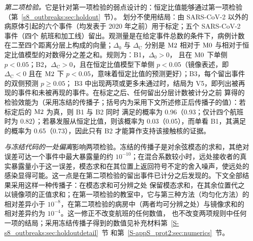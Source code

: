 \emph{第二项检验。}它是针对第一项检验的弱点设计的：恒定比值能够通过第一项检验（第~\ref{s8_outbreaks:sec:holdout}~节）。
划分不使用结局：由 SARS-CoV-2 以外的病原体引起的六个事件（均发表于 2020 年之前）用于标定；五个 SARS-CoV-2 事件（四个
航班和加工线）留出。观测量是在给定事件总数的条件下，病例计数在二至四个距离分层上构成的向量；$\Delta_0$ 与
$\Delta_{\mathrm{C}}$ 分别是 $\mathrm{M2}$ 相对于 $\mathrm{M0}$ 与相对于恒定比值模型的对数得分之差之和。规则为：B1，$\Delta_0>0$，
且在 $\mathrm{M0}$ 下单侧 $p<0.05$；B2，$\Delta_{\mathrm{C}}>0$，且在恒定比值模型下单侧 $p<0.05$（镜像表述，即
$\Delta_{\mathrm{C}}<0$ 且在 $\mathrm{M2}$ 下 $p<0.05$，意味着恒定比值的预测更好）；B3，每个留出事件的双侧预测 $p\ge0.05$；
B3 中出现两项或更多未通过时，结局为 V5，即列出被再现的事件和未被再现的事件。在标定之后、任何留出分层计数被计分之前
算得的检验效能为（采用冻结的传播子；括号内为采用下文所述修正后传播子的值）：若标定后的 $\mathrm{M2}$ 为真，则 B1 与 B2 同时
满足的概率为 0.96（0.93；仅计四个航班时为 0.82）；若暴发服从恒定比值，则该概率为 0.03（0.05），而单看 B1，其满足的概率为
0.65（0.73），因此只有 B2 才能算作支持该接触核的证据。

\emph{与冻结代码的一处偏离}影响两项检验。冻结的传播子是对余弦模态的求和，其绝对误差可达一个事件中最大暴露量的约
$10^{-10}$；在混合系数较小时，远处接收者的真实暴露量小于这一误差，模态求和在其位置上返回符号不定的舍入噪声，使远处的
感染显得可能。这一点是在第二项检验的留出事件已计分之后发现的。下文全部结果采用这样一种传播子：在模态求和可分辨之处
保留模态求和，在其余位置代之以镜像项的正值求和；在第一项检验的教室中，它与第三种方法（均匀化方法）的相对差异小于
$10^{-8}$，在第二项检验的病房中（两者均可分辨之处）与镜像求和的相对差异约为 $10^{-4}$。这一修正不改变航班的任何数值，
也不改变两项规则中任何一项的结局；采用冻结传播子得到的数值见补充材料第~\ref{S-s8_outbreaks:sec:holdoutdetail}~节
和第~\ref{S-appS_prot2:sec:numerics}~节。

